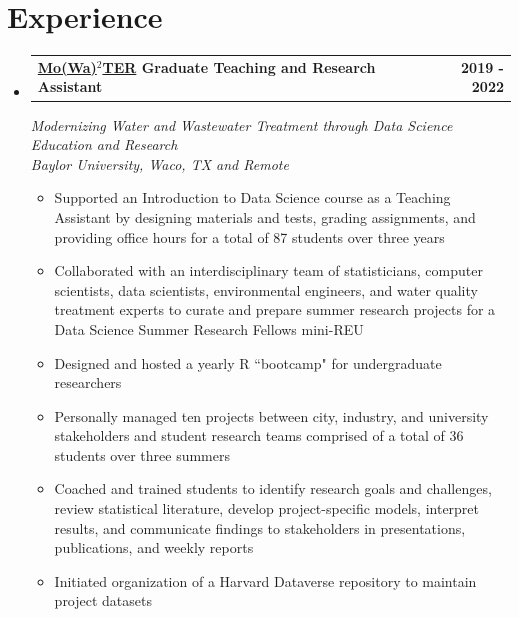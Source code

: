 \documentclass{article}
\begin{document}
%
\section{Experience}
\begin{itemize}[leftmargin=*]

	\item %
	\begin{tabular*}{0.97\textwidth}{l@{\extracolsep{\fill}}r}
	\textbf{\href{https://www.baylor.edu/mowater/}{Mo(Wa)$^{2}$TER} Graduate Teaching and Research Assistant} & \textbf{2019 - 2022}   \\
	\end{tabular*}
	\textit{Modernizing Water and Wastewater Treatment through Data Science Education and Research} \\
	\textit{Baylor University, Waco, TX and Remote} 
	\vspace{-7px}
	\begin{itemize}
		\item Supported an Introduction to Data Science course as a Teaching Assistant by designing materials and tests, grading assignments, and providing office hours for a total of 87 students over three years \vspace{-4px}
		\item Collaborated with an interdisciplinary team of statisticians, computer scientists, data scientists, environmental engineers, and water quality treatment experts to curate and prepare summer research projects for a Data Science Summer Research Fellows mini-REU \vspace{-4px}			\item Designed and hosted a yearly R ``bootcamp" for undergraduate researchers  \vspace{-4px}
		\item Personally managed ten projects between city, industry, and university stakeholders and student research teams comprised of a total of 36 students over three summers \vspace{-4px}
		\item Coached and trained students to identify research goals and challenges, review statistical literature, develop project-specific models,  interpret results, and communicate findings to stakeholders in presentations, publications, and weekly reports \vspace{-4px}
		\item Initiated organization of a Harvard Dataverse repository to maintain project datasets \vspace{-4px}
	\vspace{-4px}
	\end{itemize}
	

\end{itemize}
\end{document}
